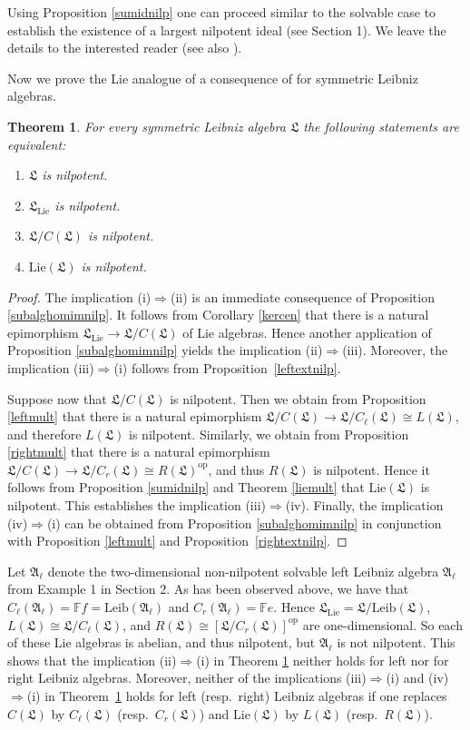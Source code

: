 \documentclass{amsart}
\newtheorem{thm}{Theorem}[section]
\numberwithin{equation}{section}
\newcommand{\op}{\mathrm{op}}
\newcommand{\lie}{\mathrm{Lie}}
\newcommand{\leib}{\mathrm{Leib}}
\newcommand{\F}{\mathbb{F}}
\newcommand{\af}{\mathfrak{A}}
\newcommand{\lf}{\mathfrak{L}}
\begin{document}
Using Proposition \ref{sumidnilp} one can proceed similar to the solvable case to establish the
existence of a largest nilpotent ideal (see Section 1). We leave the details to the interested
reader (see also \cite[Proposition 1]{G}).

Now we prove the Lie analogue of a consequence of \cite[Theorem 2.4]{S} for symmetric Leibniz
algebras.

\begin{thm}\label{nilp}
For every symmetric Leibniz algebra $\lf$ the following statements are equivalent:
\begin{enumerate}
\item[(i)]   $\lf$ is nilpotent.
\item[(ii)]  $\lf_\lie$ is nilpotent.
\item[(iii)]  $\lf/C(\lf)$ is nilpotent.
\item[(iv)] $\lie(\lf)$ is nilpotent.
\end{enumerate}
\end{thm}

\begin{proof}
The implication (i)$\Rightarrow$(ii) is an immediate consequence of Proposition \ref{subalghomimnilp}.
It follows from Corollary \ref{kercen} that there is a natural epimorphism $\lf_\lie\to\lf/C(\lf)$ of Lie
algebras. Hence another application of Proposition \ref{subalghomimnilp} yields the implication
(ii)$\Rightarrow$(iii). Moreover, the implication (iii)$\Rightarrow$(i) follows from Proposition~\ref{leftextnilp}.

Suppose now that $\lf/C(\lf)$ is nilpotent. Then we obtain from Proposition \ref{leftmult} that there
is a natural epimorphism $\lf/C(\lf)\to\lf/C_\ell(\lf)\cong L(\lf)$, and therefore $L(\lf)$ is nilpotent.
Similarly, we obtain from Proposition \ref{rightmult} that there is a natural epimorphism $\lf/C(\lf)
\to\lf/C_r(\lf)\cong R(\lf)^\op$, and thus $R(\lf)$ is nilpotent. Hence it follows from  Proposition
\ref{sumidnilp} and Theorem \ref{liemult} that $\lie(\lf)$ is nilpotent. This establishes the implication
(iii)$\Rightarrow$(iv). Finally, the implication (iv)$\Rightarrow$(i) can be obtained from Proposition
\ref{subalghomimnilp} in conjunction with Proposition \ref{leftmult} and Proposition~\ref{rightextnilp}.
\end{proof}

 Let $\af_\ell$ denote the two-dimensional non-nilpotent solvable left
Leibniz algebra $\af_\ell$ from Example 1  in Section 2. As has been observed above, we have
that $C_\ell(\af_\ell)=\F f=\leib(\af_\ell)$ and $C_r(\af_\ell)=\F e$. Hence $\lf_\lie=\lf/\leib(\lf)$,
$L(\lf)\cong\lf/C_\ell(\lf)$, and $R(\lf)\cong[\lf/C_r(\lf)]^\op$ are one-dimensional. So each of
these Lie algebras is abelian, and thus nilpotent, but $\af_\ell$ is not nilpotent. This shows that
the implication (ii)$\Rightarrow$(i) in Theorem \ref{nilp} neither holds for left nor for right
Leibniz algebras. Moreover, neither of the implications (iii)$\Rightarrow$(i) and (iv)$\Rightarrow$(i)
in Theorem~\ref{nilp} holds for left (resp.\ right) Leibniz algebras if one replaces $C(\lf)$ by
$C_\ell(\lf)$ (resp.\ $C_r(\lf)$) and $\lie(\lf)$ by $L(\lf)$ (resp.\ $R(\lf)$).
\vspace{.2cm}
\end{document}
